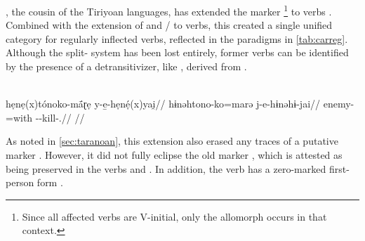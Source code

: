 \subsubsection{\carijo {}}
\label{sec:carijo}
\carijo, the cousin of the Tiriyoan languages, has extended the  marker \footnote{Since all affected  verbs are V-initial, only the  allomorph  occurs in that context.} to  verbs \parencite[105--107]{meira1998proto}.
Combined with the extension of   and  / to  verbs, this created a single unified  category for regularly inflected verbs, reflected in the paradigms in \cref{tab:carreg}.
%
%
%
Although the split- system has been lost entirely, former  verbs can be identified by the presence of a detransitivizer, like   , derived from   \parencite[179]{robayo2000avance}.

\carijo \parencite[][79]{koch1908hiana}\\
\begingl
\glpreamble hẹnẹ(x)tónoko-mā́ɽẹ y-e̱-hẹnẹ́(x)yai̯//
\gla hɨnəhtono-ko=marə j-e-hɨnəhɨ-jai//
\glb enemy-=with --kill-.//
\glft {}//
\endgl
\xe
%


As noted in \cref{sec:taranoan}, this extension also erased any traces of a putative \PTar {} marker .
However, it did not fully eclipse the old  marker , which is attested as being preserved in the verbs    and   .
In addition, the verb   has a zero-marked first-person form .

